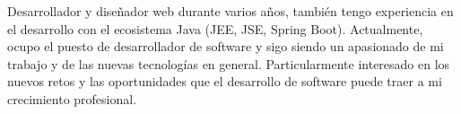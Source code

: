 %
%
\par{
Desarrollador y diseñador web durante varios años, también tengo experiencia en el desarrollo con el ecosistema Java (JEE, JSE, Spring Boot). Actualmente, ocupo el puesto de desarrollador de software y sigo siendo un apasionado de mi trabajo y de las nuevas tecnologías en general. Particularmente interesado en los nuevos retos y las oportunidades que el desarrollo de software puede traer a mi crecimiento profesional.\\
}